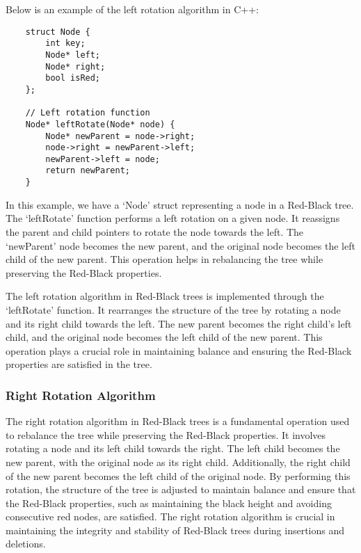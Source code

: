 \begin{solution}

    Below is an example of the left rotation algorithm in C++:

    \horizontalline

    \begin{verbatim}
    struct Node {
        int key;
        Node* left;
        Node* right;
        bool isRed;
    };
    
    // Left rotation function
    Node* leftRotate(Node* node) {
        Node* newParent = node->right;
        node->right = newParent->left;
        newParent->left = node;
        return newParent;
    }
    \end{verbatim}

    \horizontalline
    
    In this example, we have a `Node' struct representing a node in a Red-Black tree. The `leftRotate' function performs a left rotation on a given node. It reassigns the parent and child pointers to rotate the node towards the left. The `newParent' node becomes the new parent, and the original node becomes the left child of the new parent. 
    This operation helps in rebalancing the tree while preserving the Red-Black properties.

    The left rotation algorithm in Red-Black trees is implemented through the `leftRotate' function. It rearranges the structure of the tree by rotating a node and its right child towards the left. The new parent becomes the right child's left child, and the original node becomes the left child of the new parent. This operation plays a crucial 
    role in maintaining balance and ensuring the Red-Black properties are satisfied in the tree.
\end{solution}

\subsubsection{Right Rotation Algorithm}

The right rotation algorithm in Red-Black trees is a fundamental operation used to rebalance the tree while preserving the Red-Black properties. It involves rotating a node and its left child towards the right. The left child becomes the new parent, with the original node as its right child. Additionally, the right child of the new parent becomes 
the left child of the original node. By performing this rotation, the structure of the tree is adjusted to maintain balance and ensure that the Red-Black properties, such as maintaining the black height and avoiding consecutive red nodes, are satisfied. The right rotation algorithm is crucial in maintaining the integrity and stability of Red-Black 
trees during insertions and deletions.

